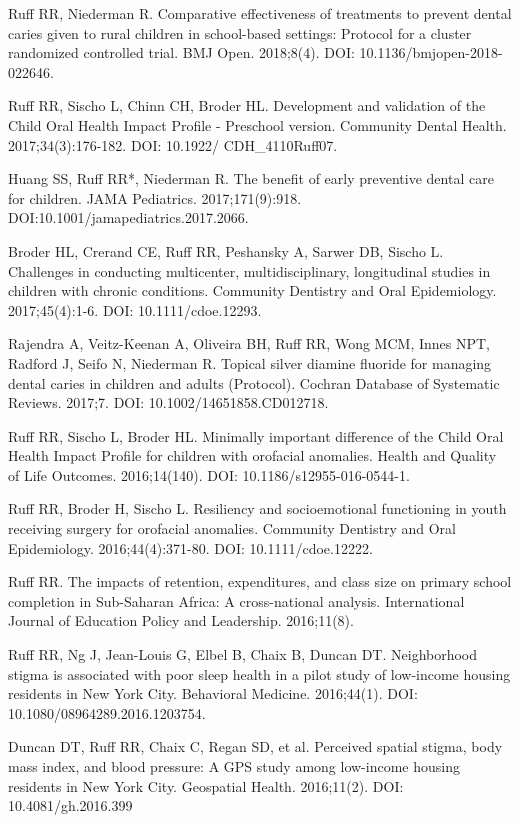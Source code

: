 \documentclass[margin,line]{res}
\begin{document}
\begin{resume}
Ruff RR, Niederman R. Comparative effectiveness of treatments to prevent dental caries given to rural children in school-based settings: Protocol for a cluster randomized controlled trial. BMJ Open. 2018;8(4). DOI: 10.1136/bmjopen-2018-022646.

Ruff RR, Sischo L, Chinn CH, Broder HL. Development and validation of the Child Oral Health Impact Profile - Preschool version. Community Dental Health. 2017;34(3):176-182. DOI: 10.1922/
CDH\_4110Ruff07.

Huang SS, Ruff RR*, Niederman R. The benefit of early preventive dental care for children. JAMA Pediatrics. 2017;171(9):918. DOI:10.1001/jamapediatrics.2017.2066.

Broder HL, Crerand CE, Ruff RR, Peshansky A, Sarwer DB, Sischo L. Challenges in conducting multicenter, multidisciplinary, longitudinal studies in children with chronic conditions. Community Dentistry and Oral Epidemiology. 2017;45(4):1-6. DOI: 10.1111/cdoe.12293.

Rajendra A, Veitz-Keenan A, Oliveira BH, Ruff RR, Wong MCM, Innes NPT, Radford J, Seifo N, Niederman R. Topical silver diamine fluoride for managing dental caries in children and adults (Protocol). Cochran Database of Systematic Reviews. 2017;7. DOI: 10.1002/14651858.CD012718.

Ruff RR, Sischo L, Broder HL. Minimally important difference of the Child Oral Health Impact Profile for children with orofacial anomalies. Health and Quality of Life Outcomes. 2016;14(140). DOI: 10.1186/s12955-016-0544-1.

Ruff RR, Broder H, Sischo L. Resiliency and socioemotional functioning in youth receiving surgery for orofacial anomalies. Community Dentistry and Oral Epidemiology. 2016;44(4):371-80. DOI: 10.1111/cdoe.12222.

Ruff RR. The impacts of retention, expenditures, and class size on primary school completion in Sub-Saharan Africa: A cross-national analysis. International Journal of Education Policy and Leadership. 2016;11(8).

Ruff RR, Ng J, Jean-Louis G, Elbel B, Chaix B, Duncan DT. Neighborhood stigma is associated with poor sleep health in a pilot study of low-income housing residents in New York City. Behavioral Medicine. 2016;44(1). DOI: 10.1080/08964289.2016.1203754.

Duncan DT, Ruff RR, Chaix C, Regan SD, et al. Perceived spatial stigma, body mass index, and blood pressure: A GPS study among low-income housing residents in New York City. Geospatial Health. 2016;11(2). DOI: 10.4081/gh.2016.399


\end{resume}
\end{document}
